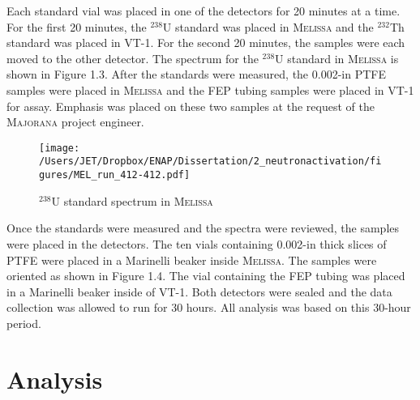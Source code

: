 Each standard vial was placed in one of the detectors for 20 minutes at a time.  For the first 20 minutes, the $^{238}$U standard was placed in \textsc{Melissa} and the $^{232}$Th standard was placed in VT-1.  For the second 20 minutes, the samples were each moved to the other detector.  The spectrum for the $^{238}$U standard in \textsc{Melissa} is shown in Figure 1.3.  After the standards were measured, the 0.002-in PTFE samples were placed in \textsc{Melissa} and the FEP tubing samples were placed in VT-1 for assay.  Emphasis was placed on these two samples at the request of the \textsc{Majorana} project engineer.  

\begin{figure}[htbp]
\centering
\texttt{[image: /Users/JET/Dropbox/ENAP/Dissertation/2\_neutronactivation/figures/MEL\_run\_412-412.pdf]}
\caption[%
$^{238}$U standard spectrum in \textsc{Melissa}
]{%
$^{238}$U standard spectrum in \textsc{Melissa}
\label{fig:mjd_cryostat}} 
\end{figure}

Once the standards were measured and the spectra were reviewed, the samples were placed in the detectors.  The ten vials containing 0.002-in thick slices of PTFE were placed in a Marinelli beaker inside \textsc{Melissa}.  The samples were oriented as shown in Figure 1.4.  The vial containing the FEP tubing was placed in a Marinelli beaker inside of VT-1.  Both detectors were sealed and the data collection was allowed to run for 30 hours.  All analysis was based on this 30-hour period.

\section{Analysis}



